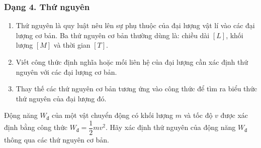 \subsubsection{Dạng 4. Thứ nguyên}
\begin{phuongphap}
\begin{enumerate}
\item Thứ nguyên là quy luật nêu lên sự phụ thuộc của đại lượng vật lí vào các đại lượng cơ bản. Ba thứ nguyên cơ bản thường dùng là: chiều dài $[L]$, khối lượng $[M]$ và thời gian $[T]$.
\item Viết công thức định nghĩa hoặc mối liên hệ của đại lượng cần xác định thứ nguyên với các đại lượng cơ bản.
\item Thay thế các thứ nguyên cơ bản tương ứng vào công thức để tìm ra biểu thức thứ nguyên của đại lượng đó.
\end{enumerate}
\end{phuongphap}
\begin{vidumau}
Động năng $W_{\mathrm{đ}}$ của một vật chuyển động có khối lượng $m$ và tốc độ $v$ được xác định bằng công thức $W_{\mathrm{đ}} = \dfrac{1}{2} m v^2$. Hãy xác định thứ nguyên của động năng $W_{\mathrm{đ}}$ thông qua các thứ nguyên cơ bản.
\end{vidumau}

